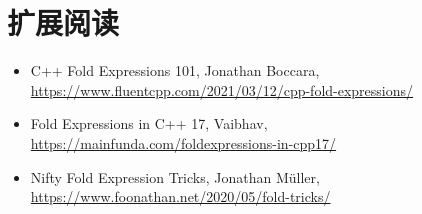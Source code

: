 \section{扩展阅读}
\begin{itemize}
  \item C++ Fold Expressions 101, Jonathan Boccara, \url{https://www.fluentcpp.com/2021/03/12/cpp-fold-expressions/}
  \item Fold Expressions in C++ 17, Vaibhav, \url{https://mainfunda.com/foldexpressions-in-cpp17/}
  \item Nifty Fold Expression Tricks, Jonathan Müller, \url{https://www.foonathan.net/2020/05/fold-tricks/}
\end{itemize}